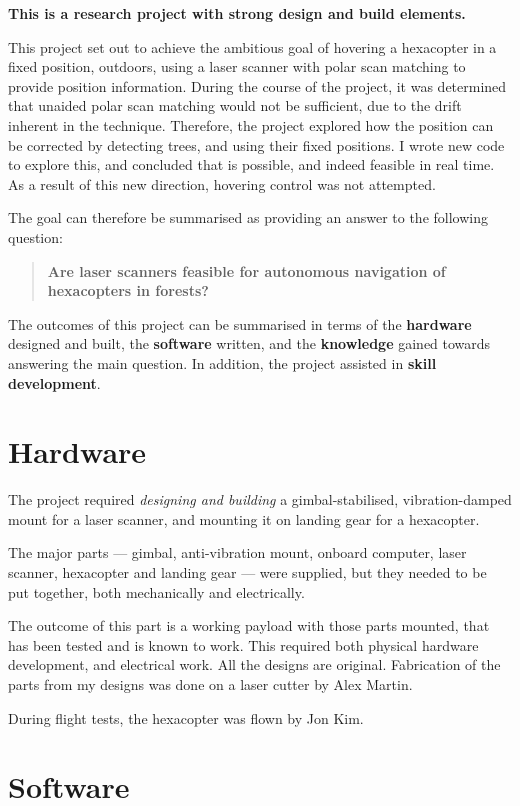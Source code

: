 \documentclass[12pt,oneside,a4paper]{book}
\begin{document}
\textbf{This is a research project with strong design and build elements.}

This project set out to achieve the ambitious goal of hovering a
hexacopter in a fixed position, outdoors, using a laser scanner with
polar scan matching to provide position information. During the course
of the project, it was determined that unaided polar scan matching
would not be sufficient, due to the drift inherent in the
technique. Therefore, the project explored how the position can be
corrected by detecting trees, and using their fixed positions. I wrote
new code to explore this, and concluded that is possible, and indeed
feasible in real time. As a result of this new direction, hovering
control was not attempted.

The goal can therefore be summarised as providing an answer to the
following question:
\begin{quote}
  \textbf{Are laser scanners feasible for autonomous navigation of
    hexacopters in forests?}
\end{quote}

The outcomes of this project can be summarised in terms of the
\textbf{hardware} designed and built, the \textbf{software} written,
and the \textbf{knowledge} gained towards answering the main
question. In addition, the project assisted in \textbf{skill
  development}.

\section{Hardware}
\label{sec:hardware-1}

The project required \emph{designing and building} a
gimbal-stabilised, vibration-damped mount for a laser scanner, and
mounting it on landing gear for a hexacopter.

The major parts --- gimbal, anti-vibration mount, onboard computer, laser
scanner, hexacopter and landing gear --- were supplied, but they needed
to be put together, both mechanically and electrically.

The outcome of this part is a working payload with those parts
mounted, that has been tested and is known to work. This required both
physical hardware development, and electrical work. All the designs
are original. Fabrication of the parts from my designs was done on a
laser cutter by Alex Martin.

During flight tests, the hexacopter was flown by Jon Kim.

\section{Software}
\label{sec:software-1}
\end{document}
